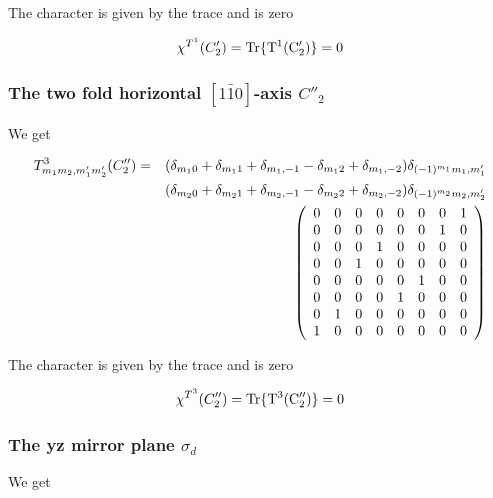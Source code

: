 The character is given by the trace and is zero

\begin{equation}
\chi^{T^1}(C'_2)=\rm Tr \{ T^1(C'_2) \}=0
\end{equation}


\subsubsection{The two fold horizontal $[1\bar 10]$-axis  $C''_2$}

We get

\begin{eqnarray}\label{bCdd23}
T^3_{m_1m_2,m'_1m'_2}(C''_2)&=&(\delta_{m_10}+\delta_{m_11}+\delta_{m_1,-1}-\delta_{m_12}+\delta_{m_1,-2})
\delta_{(-1)^{m_1}m_1,m'_1}\\ \nonumber
&&(\delta_{m_20}+\delta_{m_21}+\delta_{m_2,-1}-\delta_{m_22}+\delta_{m_2,-2})
\delta_{(-1)^{m_2}m_2,m'_2}\\ \nonumber
&&\left (
\begin{array}{ccccccccc}
0 & 0 & 0 & 0 & 0 & 0 & 0 & 1\\
0 & 0 & 0 & 0 & 0 & 0 & 1 & 0\\
0 & 0 & 0 & 1 & 0 & 0 & 0 & 0\\
0 & 0 & 1 & 0 & 0 & 0 & 0 & 0\\ 
0 & 0 & 0 & 0 & 0 & 1 & 0 & 0\\ 
0 & 0 & 0 & 0 & 1 & 0 & 0 & 0\\ 
0 & 1 & 0 & 0 & 0 & 0 & 0 & 0\\ 
1 & 0 & 0 & 0 & 0 & 0 & 0 & 0\\ 
\end{array} \right )
\end{eqnarray}

The character is given by the trace and is zero

\begin{equation}
\chi^{T^3}(C''_2)=\rm Tr \{ T^3(C''_2) \}=0
\end{equation}


\subsubsection{The yz mirror plane  $\sigma_d$}


We get

